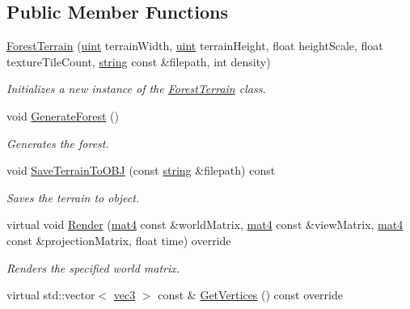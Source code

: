 \subsection*{Public Member Functions}
\begin{DoxyCompactItemize}
\item 
\hyperlink{class_forest_terrain_a2cfcbadbae4c5904c40f52636cd16118}{Forest\+Terrain} (\hyperlink{_types_8h_a4f5fce8c1ef282264f9214809524d836}{uint} terrain\+Width, \hyperlink{_types_8h_a4f5fce8c1ef282264f9214809524d836}{uint} terrain\+Height, float height\+Scale, float texture\+Tile\+Count, \hyperlink{_types_8h_ad453f9f71ce1f9153fb748d6bb25e454}{string} const \&filepath, int density)
\begin{DoxyCompactList}\small\item\em Initializes a new instance of the \hyperlink{class_forest_terrain}{Forest\+Terrain} class. \end{DoxyCompactList}\item 
void \hyperlink{class_forest_terrain_a00b38761747044c6b5b786082671548e}{Generate\+Forest} ()
\begin{DoxyCompactList}\small\item\em Generates the forest. \end{DoxyCompactList}\item 
void \hyperlink{class_forest_terrain_a04c699a9e59086ea267d01387a9fd918}{Save\+Terrain\+To\+O\+BJ} (const \hyperlink{_types_8h_ad453f9f71ce1f9153fb748d6bb25e454}{string} \&filepath) const 
\begin{DoxyCompactList}\small\item\em Saves the terrain to object. \end{DoxyCompactList}\item 
virtual void \hyperlink{class_forest_terrain_a6bd4f25a6efd0e1b4b77755c227ad3f7}{Render} (\hyperlink{_types_8h_a2db59f395fe82a7394c6324956c265d8}{mat4} const \&world\+Matrix, \hyperlink{_types_8h_a2db59f395fe82a7394c6324956c265d8}{mat4} const \&view\+Matrix, \hyperlink{_types_8h_a2db59f395fe82a7394c6324956c265d8}{mat4} const \&projection\+Matrix, float time) override
\begin{DoxyCompactList}\small\item\em Renders the specified world matrix. \end{DoxyCompactList}\item 
virtual std\+::vector$<$ \hyperlink{_types_8h_a3d0ce73e3199de81565fb01632415288}{vec3} $>$ const \& \hyperlink{class_forest_terrain_a9d00b6d342c76831c2353a278f41a3e8}{Get\+Vertices} () const  override

\end{DoxyCompactItemize}
